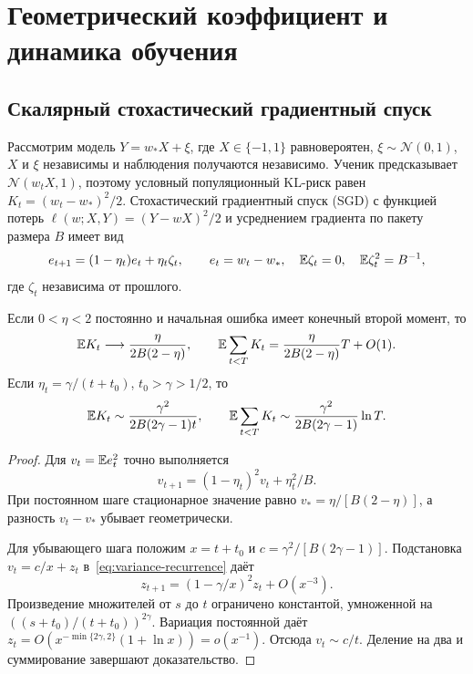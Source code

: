 \section{Геометрический коэффициент и динамика обучения}
\label{sec:dynamics}

\subsection{Скалярный стохастический градиентный спуск}

Рассмотрим модель $Y=w_*X+\xi$, где $X\in\{-1,1\}$ равновероятен,
$\xi\sim\mathcal N(0,1)$, $X$ и $\xi$ независимы и наблюдения получаются
независимо. Ученик предсказывает
$\mathcal N(w_tX,1)$, поэтому условный популяционный KL-риск равен
$K_t=(w_t-w_*)^2/2$. Стохастический градиентный спуск (SGD) с функцией
потерь $\ell(w;X,Y)=(Y-wX)^2/2$ и усреднением градиента по пакету размера $B$
имеет вид
\[
 e_{t+1}=(1-\eta_t)e_t+\eta_t\zeta_t,\qquad
 e_t=w_t-w_*,\quad\mathbb E\zeta_t=0,\quad\mathbb E\zeta_t^2=B^{-1},
\]
где $\zeta_t$ независима от прошлого.

\begin{proposition}
\label{prop:scalar}
Если $0<\eta<2$ постоянно и начальная ошибка имеет конечный второй момент, то
\begin{equation}
 \mathbb E K_t\longrightarrow\frac{\eta}{2B(2-\eta)},\qquad
 \mathbb E\sum_{t<T}K_t=\frac{\eta}{2B(2-\eta)}T+O(1).
 \label{eq:constant-sgd}
\end{equation}
Если $\eta_t=\gamma/(t+t_0)$, $t_0>\gamma>1/2$, то
\begin{equation}
 \mathbb E K_t\sim\frac{\gamma^2}{2B(2\gamma-1)t},\qquad
 \mathbb E\sum_{t<T}K_t\sim\frac{\gamma^2}{2B(2\gamma-1)}\ln T.
 \label{eq:decaying-sgd}
\end{equation}
\end{proposition}
\begin{proof}
Для $v_t=\mathbb E e_t^2$ точно выполняется
\begin{equation}
 v_{t+1}=(1-\eta_t)^2v_t+\eta_t^2/B.
 \label{eq:variance-recurrence}
\end{equation}
При постоянном шаге стационарное значение равно
$v_*=\eta/[B(2-\eta)]$, а разность $v_t-v_*$ убывает геометрически.

Для убывающего шага положим $x=t+t_0$ и
$c=\gamma^2/[B(2\gamma-1)]$. Подстановка $v_t=c/x+z_t$
в~\eqref{eq:variance-recurrence} даёт
\[
 z_{t+1}=(1-\gamma/x)^2z_t+O(x^{-3}).
\]
Произведение множителей от $s$ до $t$ ограничено константой, умноженной на
$((s+t_0)/(t+t_0))^{2\gamma}$. Вариация постоянной даёт
$z_t=O(x^{-\min\{2\gamma,2\}}(1+\ln x))=o(x^{-1})$.
Отсюда $v_t\sim c/t$. Деление на два и суммирование завершают доказательство.
\end{proof}

